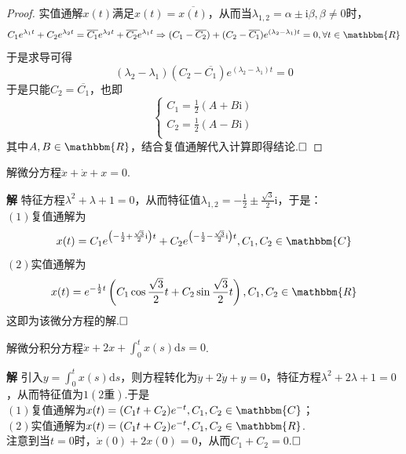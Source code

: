 \documentclass{ctexart}
\newenvironment{custom}[1]{\par\noindent \textbf{#1}\quad}{\par\vspace{1em}}
\begin{document}
\begin{proof}
实值通解$x(t)$满足$x(t)=\overline{x(t)}$，从而当$\lambda_{1,2}=\alpha\pm\mathrm{i}\beta,\beta\neq 0$时，
$$C_{1}e^{\lambda_{1}t}+C_{2}e^{\lambda_{2}t}=\overline{C_{1}}e^{\lambda_{2}t}+\overline{C_{2}}e^{\lambda_{1}t}\Rightarrow (C_{1}-\overline{C_{2}})+(C_{2}-\overline{C_{1}})e^{(\lambda_{2}-\lambda_{1})t}=0,\forall t\in\mathbbm{R}$$
于是求导可得
$$(\lambda_{2}-\lambda_{1})(C_{2}-\overline{C_{1}})e^{(\lambda_{2}-\lambda_{1})t}=0$$
于是只能$C_{2}=\overline{C_{1}}$，也即
$$\left\{\begin{aligned}C_{1}=\frac{1}{2}\left(A+B\mathrm{i}\right)\\C_{2}=\frac{1}{2}\left(A-B\mathrm{i}\right)\\\end{aligned}\right.$$
其中$A,B\in\mathbbm{R}$，结合复值通解代入计算即得结论.$\hfill{\square}$
\end{proof}

\begin{example}
解微分方程$\ddot{x}+\dot{x}+x=0$.
\end{example}

\begin{custom}{解}
特征方程$\lambda^{2}+\lambda+1=0$，从而特征值$\lambda_{1,2}=-\frac{1}{2}\pm\frac{\sqrt{3}}{2}\mathrm{i}$，于是：\\
$(1)$复值通解为
$$x(t)=C_{1}e^{\left(-\frac{1}{2}+\frac{\sqrt{3}}{2}\mathrm{i}\right)t}+C_{2}e^{\left(-\frac{1}{2}-\frac{\sqrt{3}}{2}\mathrm{i}\right)t},C_{1},C_{2}\in\mathbbm{C}$$
$(2)$实值通解为
$$x(t)=e^{-\frac{1}{2}t}\left(C_{1}\cos{\frac{\sqrt{3}}{2}t}+C_{2}\sin{\frac{\sqrt{3}}{2}t}\right),C_{1},C_{2}\in\mathbbm{R}$$
这即为该微分方程的解.$\hfill{\square}$
\end{custom}

\begin{example}
解微分积分方程$\dot{x}+2x+\int_{0}^{t}{x(s)\mathrm{d}s}=0$.
\end{example}

\begin{custom}{解}
引入$y=\int_{0}^{t}{x(s)\mathrm{d}s}$，则方程转化为$\ddot{y}+2\dot{y}+y=0$，特征方程$\lambda^{2}+2\lambda+1=0$，从而特征值为$1(2\text{重})$.于是\\
$(1)$复值通解为$x(t)=(C_{1}t+C_{2})e^{-t},C_{1},C_{2}\in\mathbbm{C}$；\\
$(2)$实值通解为$x(t)=(C_{1}t+C_{2})e^{-t},C_{1},C_{2}\in\mathbbm{R}$.\\
注意到当$t=0$时，$\dot{x}(0)+2x(0)=0$，从而$C_{1}+C_{2}=0$.$\hfill{\square}$
\end{custom}
\end{document}
